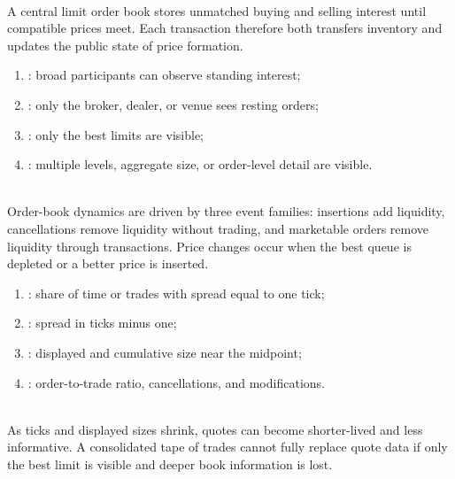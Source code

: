 \documentclass[a4paper,oneside,openany]{book}
\begin{document}
\begin{principle} \\
A central limit order book stores unmatched buying and selling interest until compatible prices meet. Each transaction therefore both transfers inventory and updates the public state of price formation.
\end{principle}

\begin{taxonomy} 
\begin{enumerate}[label=\roman*.]
\setlength{\itemsep}{0pt}
\item {}: broad participants can observe standing interest;
\item {}: only the broker, dealer, or venue sees resting orders;
\item {}: only the best limits are visible;
\item {}: multiple levels, aggregate size, or order-level detail are visible.
\end{enumerate}
\end{taxonomy}

\begin{mechanism} \\
Order-book dynamics are driven by three event families: insertions add liquidity, cancellations remove liquidity without trading, and marketable orders remove liquidity through transactions. Price changes occur when the best queue is depleted or a better price is inserted.
\end{mechanism}

\begin{taxonomy} 
\begin{enumerate}[label=\roman*.]
\setlength{\itemsep}{0pt}
\item {}: share of time or trades with spread equal to one tick;
\item {}: spread in ticks minus one;
\item {}: displayed and cumulative size near the midpoint;
\item {}: order-to-trade ratio, cancellations, and modifications.
\end{enumerate}
\end{taxonomy}

\begin{caveat} \\
As ticks and displayed sizes shrink, quotes can become shorter-lived and less informative. A consolidated tape of trades cannot fully replace quote data if only the best limit is visible and deeper book information is lost.
\end{caveat}
\end{document}
